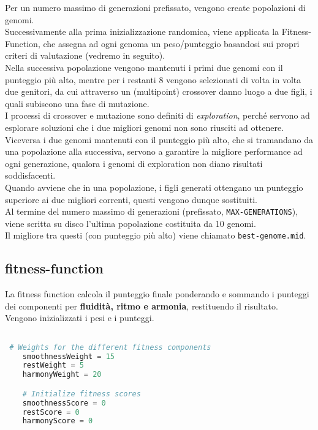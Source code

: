 \documentclass[a4paper,12pt]{report}
\begin{document}
Per un numero massimo di generazioni prefissato, vengono create popolazioni di genomi. \\
Successivamente alla prima inizializzazione randomica, viene applicata la Fitness-Function, che assegna ad ogni genoma un peso/punteggio basandosi sui propri criteri di valutazione (vedremo in seguito). \\
Nella successiva popolazione vengono mantenuti i primi due genomi con il punteggio più alto, mentre per i restanti 8 vengono selezionati di volta in volta due genitori, da cui attraverso un (multipoint) crossover danno luogo a due figli, i quali subiscono una fase di mutazione. \\
I processi di crossover e mutazione sono definiti di \textit{exploration}, perché servono ad esplorare soluzioni che i due migliori genomi non sono riusciti ad ottenere. \\
Viceversa i due genomi mantenuti con il punteggio più alto, che si tramandano da una popolazione alla successiva, servono a garantire la migliore performance ad ogni generazione, qualora i genomi di exploration non diano risultati soddisfacenti. \\
Quando avviene che in una popolazione, i figli generati ottengano un punteggio superiore ai due migliori correnti, questi vengono dunque sostituiti. \\
Al termine del numero massimo di generazioni (prefissato, \texttt{MAX-GENERATIONS}), viene scritta su disco l'ultima popolazione costituita da 10 genomi. \\
Il migliore tra questi (con punteggio più alto) viene chiamato \texttt{best-genome.mid}. 

\subsection{fitness-function}

La fitness function calcola il punteggio finale ponderando e sommando i punteggi dei componenti per \textbf{fluidità, ritmo e armonia}, restituendo il risultato. \\
Vengono inizializzati i pesi e i punteggi.

\begin{lstlisting}[language=Python]

 # Weights for the different fitness components
    smoothnessWeight = 15
    restWeight = 5
    harmonyWeight = 20

    # Initialize fitness scores
    smoothnessScore = 0
    restScore = 0
    harmonyScore = 0
    
\end{lstlisting}
\end{document}
